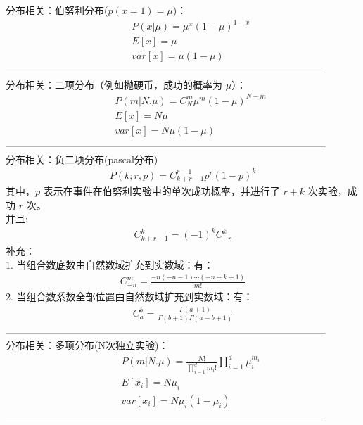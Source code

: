 \documentclass{article}
\begin{document}
\noindent 分布相关：伯努利分布($p(x=1) = \mu$)：\\
\begin{eqnarray*}
&&P(x|\mu) = \mu^{x}(1-\mu)^{1-x}\\
&&E[x] = \mu\\
&&var[x] = \mu(1-\mu)
\end{eqnarray*}
--------------------------------------------------------------------------------------------------\\

\noindent 分布相关：二项分布（例如抛硬币，成功的概率为 $\mu$）：\\
\begin{eqnarray*}
&&P(m|N.\mu) = C_{N}^{m}\mu^{m}(1-\mu)^{N-m}\\
&&E[x] = N\mu\\
&&var[x] = N\mu(1-\mu)
\end{eqnarray*}
--------------------------------------------------------------------------------------------------\\

\noindent 分布相关：负二项分布(pascal分布)\\
\begin{eqnarray*}
P(k;r,p)= C_{k+r-1}^{r-1}p^{r}(1-p)^{k}
\end{eqnarray*}
其中，$p$ 表示在事件在伯努利实验中的单次成功概率，并进行了 $r+k$ 次实验，成功 $r$ 次。\\
并且:
\begin{eqnarray*}
C_{k+r-1}^{k} = (-1)^{k}C_{-r}^{k}
\end{eqnarray*}
补充：\\
1. 当组合数底数由自然数域扩充到实数域：有：
\begin{eqnarray*}
C_{-n}^{m}= \frac{-n(-n-1)\cdots(-n-k+1)}{m!}
\end{eqnarray*}
2. 当组合数系数全部位置由自然数域扩充到实数域：有：
\begin{eqnarray*}
C_{a}^{b} = \frac{\Gamma(a+1)}{\Gamma(b+1)\Gamma(a-b+1)}
\end{eqnarray*}
--------------------------------------------------------------------------------------------------\\

\noindent 分布相关：多项分布(N次独立实验)：\\
\begin{eqnarray*}
&&P(m|N.\mu) = \frac{N!}{\prod_{i=1}^{d}m_{i}!}\prod_{i=1}^{d}\mu_{i}^{m_{i}}\\
&&E[x_{i}] = N\mu_{i}\\
&&var[x_{i}] = N\mu_{i}(1-\mu_{i})
\end{eqnarray*}
--------------------------------------------------------------------------------------------------\\
\end{document}
